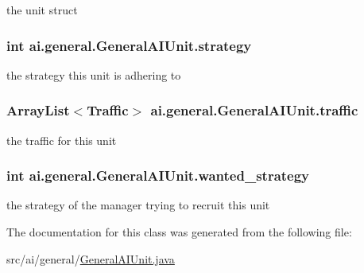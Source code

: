 \label{classai_1_1general_1_1_general_a_i_unit_aa117dac9c797112c91e035b392fb5dde}
the unit struct \hypertarget{classai_1_1general_1_1_general_a_i_unit_ae763c73974ba06f4a3578e6dd3b0ff3e}{
\subsubsection[{strategy}]{\setlength{\rightskip}{0pt plus 5cm}int {\bf ai.general.GeneralAIUnit.strategy}}}
\label{classai_1_1general_1_1_general_a_i_unit_ae763c73974ba06f4a3578e6dd3b0ff3e}
the strategy this unit is adhering to \hypertarget{classai_1_1general_1_1_general_a_i_unit_a04949d5f41cc9464ad71d5169fc0c951}{
\subsubsection[{traffic}]{\setlength{\rightskip}{0pt plus 5cm}ArrayList$<${\bf Traffic}$>$ {\bf ai.general.GeneralAIUnit.traffic}}}
\label{classai_1_1general_1_1_general_a_i_unit_a04949d5f41cc9464ad71d5169fc0c951}
the traffic for this unit \hypertarget{classai_1_1general_1_1_general_a_i_unit_ac9dd9c31d79a3d6bac5d9f7aa3b4a64a}{
\subsubsection[{wanted\_\-strategy}]{\setlength{\rightskip}{0pt plus 5cm}int {\bf ai.general.GeneralAIUnit.wanted\_\-strategy}}}
\label{classai_1_1general_1_1_general_a_i_unit_ac9dd9c31d79a3d6bac5d9f7aa3b4a64a}
the strategy of the manager trying to recruit this unit 

The documentation for this class was generated from the following file:\begin{DoxyCompactItemize}
\item 
src/ai/general/\hyperlink{_general_a_i_unit_8java}{GeneralAIUnit.java}\end{DoxyCompactItemize}
